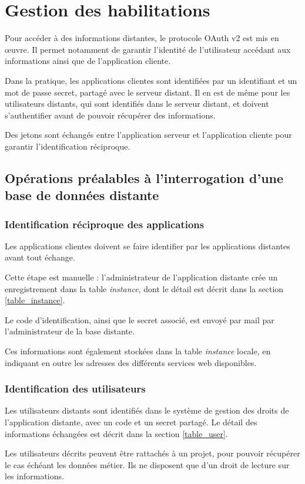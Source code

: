 \chapter{Gestion des habilitations}
\label{oauth}
Pour accéder à des informations distantes, le protocole OAuth v2 est mis en œuvre. Il permet notamment de garantir l'identité de l'utilisateur accédant aux informations ainsi que de l'application cliente.

Dans la pratique, les applications clientes sont identifiées par un identifiant et un mot de passe secret, partagé avec le serveur distant.
Il en est de même pour les utilisateurs distants, qui sont identifiés dans le serveur distant, et doivent s'authentifier avant de pouvoir récupérer des informations.

Des jetons sont échangés entre l'application serveur et l'application cliente pour garantir l'identification réciproque. 

\section{Opérations préalables à l'interrogation d'une base de données distante}
\subsection{Identification réciproque des applications}

Les applications clientes doivent se faire identifier par les applications distantes avant tout échange.

Cette étape est manuelle : l'administrateur de l'application distante crée un enregistrement dans la table \textit{instance}, dont le détail est décrit dans la section \ref{table_instance}.

Le code d'identification, ainsi que le secret associé, est envoyé par mail par l'administrateur de la base distante.

Ces informations sont également stockées dans la table \textit{instance} locale, en indiquant en outre les adresses des différents services web disponibles.

\subsection{Identification des utilisateurs}
Les utilisateurs distants sont identifiés dans le système de gestion des droits de l'application distante, avec un code et un secret partagé. Le détail des informations échangées est décrit dans la section \ref{table_user}.

Les utilisateurs décrits peuvent être rattachés à un projet, pour pouvoir récupérer le cas échéant les données \og métier\fg{}. Ils ne disposent que d'un droit de lecture sur les informations.
